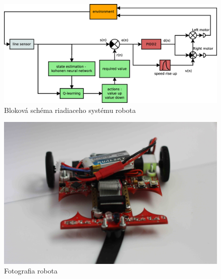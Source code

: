 \begin{figure}[!htb]
\center
\includegraphics[scale=.3]{../diagrams/motoko_robot_block.eps}
\caption{Bloková schéma riadiaceho systému robota}
\label{img:motoko_block}
\end{figure}


\begin{figure}[!htb]
\center
\includegraphics[scale=.08]{../pictures/motoko_aftermath_front.jpg}
\caption{Fotografia robota}
\label{img:motoko_photo}
\end{figure}
